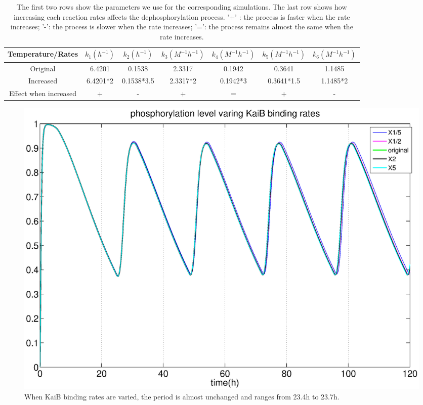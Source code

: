 \documentclass[a4paper,10pt]{article}
\numberwithin{equation}{section}
\begin{document}
\begin{table}
\centering
 \begin{tabular}{||c|| c c c c c c |} 
 \hline
 Temperature/Rates & $k_1 (h^{-1})$ & $k_2(h^{-1})$ & $k_3(M^{-1}h^{-1})$ & $k_4(M^{-1}h^{-1})$ & $k_5(M^{-1}h^{-1})$ & $k_6(M^{-1}h^{-1})$ \\ [0.5ex] 
 \hline\hline
 Original & 6.4201 & 0.1538 & 2.3317 & 0.1942  &0.3641 & 1.1485 \\ 
 \hline
 Increased & 6.4201*2 & 0.1538*3.5 & 2.3317*2 & 0.1942*3  &0.3641*1.5 & 1.1485*2\\
 \hline
 Effect when increased &  +  & - & + & = & + & -\\[0.5ex]
 \hline
\end{tabular}
\caption{\selectfont The first two rows show the parameters we use for the corresponding simulations. The last row shows how increasing each reaction rates affects the dephosphorylation process. '+' : the process is faster when the rate increases; '-': the process is slower when the rate increases; '=': the process remains almost the same when the rate increases.}
\label{table:autodps}
\end{table}


\begin{figure}[H]
\centering
\includegraphics[scale=0.45]{tempcomp1.eps}
\caption{\selectfont When KaiB binding rates are varied, the period is almost unchanged and ranges from 23.4h to 23.7h.}\label{fig:varyb}
\end{figure}

\end{document}
